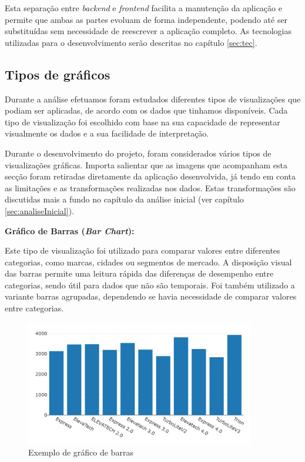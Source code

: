 Esta separação entre \textit{backend} e \textit{frontend} facilita a manutenção da aplicação e permite que ambas as partes evoluam de forma independente, podendo até ser substituídas sem necessidade de reescrever a aplicação completo. As tecnologias utilizadas para o desenvolvimento serão descritas no capítulo \ref{sec:tec}.

\subsection{Tipos de gráficos}

Durante a análise efetuamos foram estudados diferentes tipos de visualizações que podiam ser aplicadas, de acordo com os dados que tinhamos disponíveis. Cada tipo de visualização foi escolhido com base na sua capacidade de representar visualmente os dados e a sua facilidade de interpretação. 

Durante o desenvolvimento do projeto, foram considerados vários tipos de visualizações gráficas. Importa salientar que as imagens que acompanham esta secção foram retiradas diretamente da aplicação desenvolvida, já tendo em conta as limitações e as transformações realizadas nos dados. Estas transformações são discutidas mais a fundo no capítulo da análise inicial (ver capítulo \ref{sec:analiseInicial}).

\textbf{Gráfico de Barras (\textit{Bar Chart}):}

Este tipo de visualização foi utilizado para comparar valores entre diferentes categorias, como marcas, cidades ou segmentos de mercado. A disposição visual das barras permite uma leitura rápida das diferenças de desempenho entre categorias, sendo útil para dados que não são temporais. Foi também utilizado a variante barras agrupadas, dependendo se havia necessidade de comparar valores entre categorias.


\begin{figure}[H]
\centering
\includegraphics[max width=10cm]{./img/barras1}
\caption{Exemplo de gráfico de barras}
\end{figure}

